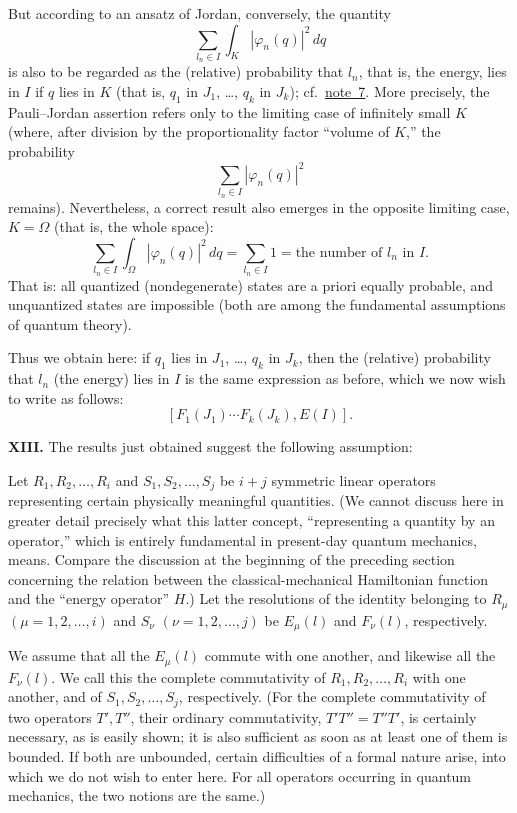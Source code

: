 \documentclass[fontsize=13pt,paper=b5,twoside,bookmarkpackage=false]{scrartcl}
\newcommand{\articleSection}[1]{%
  \par\addvspace{\medskipamount}\phantomsection\label{sec:#1}%
  \pdfbookmark[1]{Section #1}{section-#1}%
  \noindent\textbf{#1.}\enspace\ignorespaces}
\newcommand{\fnref}[1]{\hyperref[fn:#1]{note~#1}}
\begin{document}
But according to an ansatz of Jordan, conversely, the quantity
\[
 \sum_{l_n\in I}\int_K|\varphi_n(q)|^2\,dq
\]
is also to be regarded as the (relative) probability that $l_n$, that is, the energy, lies in $I$ if $q$ lies in $K$ (that is, $q_1$ in $J_1$, \ldots, $q_k$ in $J_k$); cf.\ \fnref{7}. More precisely, the Pauli--Jordan assertion refers only to the limiting case of infinitely small $K$ (where, after division by the proportionality factor ``volume of $K$,'' the probability
\[
 \sum_{l_n\in I}|\varphi_n(q)|^2
\]
remains). Nevertheless, a correct result also emerges in the opposite limiting case, $K=\Omega$ (that is, the whole space):
\[
 \sum_{l_n\in I}\int_\Omega|\varphi_n(q)|^2\,dq
 =\sum_{l_n\in I}1=\text{the number of }l_n\text{ in }I.
\]
That is: all quantized (nondegenerate) states are a priori equally probable, and unquantized states are impossible (both are among the fundamental assumptions of quantum theory).

Thus we obtain here: if $q_1$ lies in $J_1$, \ldots, $q_k$ in $J_k$, then the (relative) probability that $l_n$ (the energy) lies in $I$ is the same expression as before, which we now wish to write as follows:
\[
 [F_1(J_1)\cdots F_k(J_k),E(I)].
\]

\articleSection{XIII}
The results just obtained suggest the following assumption:

Let $R_1,R_2,\ldots,R_i$ and $S_1,S_2,\ldots,S_j$ be $i+j$ symmetric linear operators representing certain physically meaningful quantities. (We cannot discuss here in greater detail precisely what this latter concept, ``representing a quantity by an operator,'' which is entirely fundamental in present-day quantum mechanics, means. Compare the discussion at the beginning of the preceding section concerning the relation between the classical-mechanical Hamiltonian function and the ``energy operator'' $H$.) Let the resolutions of the identity belonging to $R_\mu$ $(\mu=1,2,\ldots,i)$ and $S_\nu$ $(\nu=1,2,\ldots,j)$ be $E_\mu(l)$ and $F_\nu(l)$, respectively.

We assume that all the $E_\mu(l)$ commute with one another, and likewise all the $F_\nu(l)$. We call this the complete commutativity of $R_1,R_2,\ldots,R_i$ with one another, and of $S_1,S_2,\ldots,S_j$, respectively. (For the complete commutativity of two operators $T',T''$, their ordinary commutativity, $T'T''=T''T'$, is certainly necessary, as is easily shown; it is also sufficient as soon as at least one of them is bounded. If both are unbounded, certain difficulties of a formal nature arise, into which we do not wish to enter here. For all operators occurring in quantum mechanics, the two notions are the same.)
\end{document}
